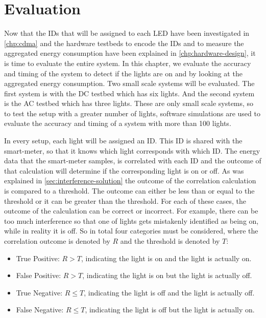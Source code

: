 
\chapter{Evaluation}
\label{chp:evaluation}




Now that the IDs that will be assigned to each LED have been investigated in \autoref{chp:cdma} and the hardware testbeds to encode the IDs and to measure the aggregated energy consumption have been explained in \autoref{chp:hardware-design}, it is time to evaluate the entire system.
In this chapter, we evaluate the accuracy and timing of the system to detect if the lights are on and by looking at the aggregated energy consumption.
Two small scale systems will be evaluated.
The first system is with the DC testbed which has six lights.
And the second system is the AC testbed which has three lights.
These are only small scale systems, so to test the setup with a greater number of lights, software simulations are used to evaluate the accuracy and timing of a system with more than 100 lights.




In every setup, each light will be assigned an ID.
This ID is shared with the smart-meter, so that it knows which light corresponds with which ID.
The energy data that the smart-meter samples, is correlated with each ID and the outcome of that calculation will determine if the corresponding light is on or off.
As was explained in \autoref{sec:interference-solution} the outcome of the correlation calculation is compared to a threshold.
The outcome can either be less than or equal to the threshold or it can be greater than the threshold.
For each of these cases, the outcome of the calculation can be correct or incorrect.
For example, there can be too much interference so that one of lights gets mistakenly identified as being on, while in reality it is off.
So in total four categories must be considered, where the correlation outcome is denoted by $R$ and the threshold is denoted by $T$:




\begin{itemize}

	\item True Positive: $R > T$, indicating the light is on and the light is actually on.

	\item False Positive: $R > T$, indicating the light is on but the light is actually off.

	\item True Negative: $R \le T$, indicating the light is off and the light is actually off.

	\item False Negative: $R \le T$, indicating the light is off but the light is actually on.


\end{itemize}




